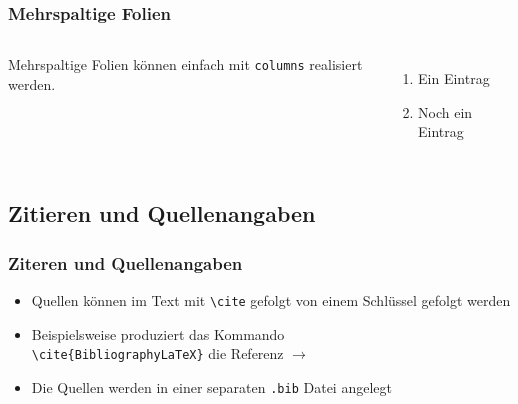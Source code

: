 \begin{frame}
	\frametitle{Mehrspaltige Folien}
	\begin{columns}
		Mehrspaltige Folien können einfach mit \texttt{columns} realisiert werden.
		\begin{enumerate}
			\item Ein Eintrag
			\item Noch ein Eintrag
		\end{enumerate}
	\end{columns}
\end{frame}

\subsection{Zitieren und Quellenangaben}


\begin{frame}[fragile]
	\frametitle{Ziteren und Quellenangaben}
	
	\begin{itemize}
		\item Quellen können im Text mit \verb|\cite| gefolgt von einem Schlüssel gefolgt werden
		\item Beispielsweise produziert das Kommando\\ \verb|\cite{BibliographyLaTeX}|
		 die Referenz $\rightarrow$ \cite{BibliographyLaTeX}
		 \item Die Quellen werden in einer separaten \texttt{.bib} Datei angelegt
	\end{itemize}
	
\end{frame}
